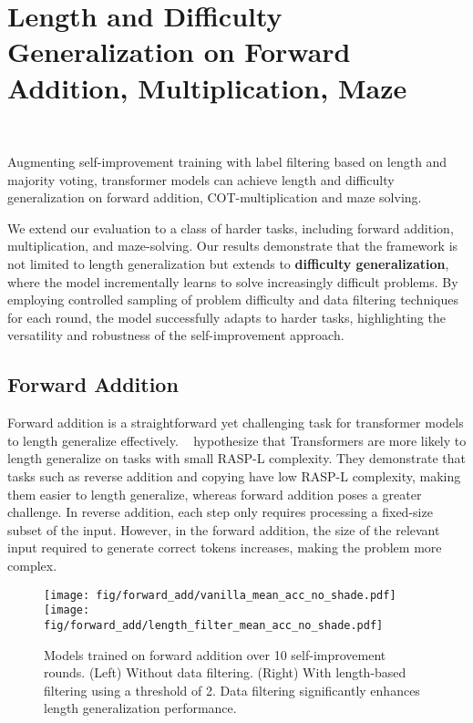 
\section{Length and Difficulty Generalization on Forward Addition, Multiplication, Maze}~\label{sec:harder_tasks}

\begin{finding}
    Augmenting self-improvement training with label filtering based on length and majority voting, transformer models can achieve length and difficulty generalization on forward addition, COT-multiplication and maze solving. 
\end{finding}

We extend our evaluation to a class of harder tasks, including forward addition, multiplication, and maze-solving. %
Our results demonstrate that the framework is not limited to length generalization but extends to \textbf{difficulty generalization}, where the model incrementally learns to solve increasingly difficult problems. By employing controlled sampling of problem difficulty and data filtering techniques for each round, the model successfully adapts to harder tasks, highlighting the versatility and robustness of the self-improvement approach.

\subsection{Forward Addition}\label{sec:forward_addition}
Forward addition is a straightforward yet challenging task for transformer models to length generalize effectively. ~\citet{zhou2023algorithms} hypothesize that Transformers are more likely to length generalize on tasks with small RASP-L complexity. They demonstrate that tasks such as reverse addition and copying have low RASP-L complexity, making them easier to length generalize, whereas forward addition poses a greater challenge. 
In reverse addition, each step only requires processing a fixed-size subset of the input. However, in the forward addition, the size of the relevant input required to generate correct tokens increases, making the problem more complex. 

\begin{figure}
    \centering
    \texttt{[image: fig/forward\_add/vanilla\_mean\_acc\_no\_shade.pdf]}
    \hspace{2mm}
    \texttt{[image: fig/forward\_add/length\_filter\_mean\_acc\_no\_shade.pdf]}
    \caption{Models trained on forward addition over 10 self-improvement rounds. (Left) Without data filtering. (Right) With length-based filtering using a threshold of 2. Data filtering significantly enhances length generalization performance.}
    \label{fig:filtering_forward_add}
\end{figure}


